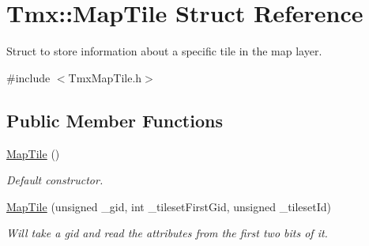 \hypertarget{structTmx_1_1MapTile}{\section{Tmx\-:\-:Map\-Tile Struct Reference}
\label{structTmx_1_1MapTile}
}


Struct to store information about a specific tile in the map layer.  




{\ttfamily \#include $<$Tmx\-Map\-Tile.\-h$>$}

\subsection*{Public Member Functions}
\begin{DoxyCompactItemize}
\item 
\hypertarget{structTmx_1_1MapTile_a1e914d4cb599e79ade3cf178879b9135}{\hyperlink{structTmx_1_1MapTile_a1e914d4cb599e79ade3cf178879b9135}{Map\-Tile} ()}\label{structTmx_1_1MapTile_a1e914d4cb599e79ade3cf178879b9135}

\begin{DoxyCompactList}\small\item\em Default constructor. \end{DoxyCompactList}\item 
\hyperlink{structTmx_1_1MapTile_a2ce4eaefeb86a127535521c32eed9cf3}{Map\-Tile} (unsigned \-\_\-gid, int \-\_\-tileset\-First\-Gid, unsigned \-\_\-tileset\-Id)
\begin{DoxyCompactList}\small\item\em Will take a gid and read the attributes from the first two bits of it. \end{DoxyCompactList}\end{DoxyCompactItemize}
